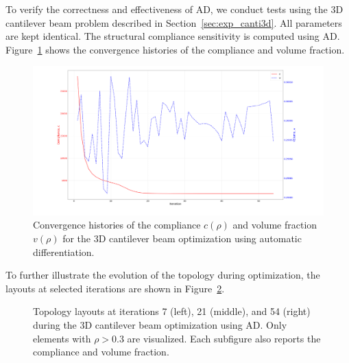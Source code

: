\documentclass[mathpazo]{cicp}
\begin{document}
To verify the correctness and effectiveness of AD, we conduct tests using the 3D cantilever beam problem described in Section~\ref{sec:exp_canti3d}. All parameters are kept identical. The structural compliance sensitivity is computed using AD. Figure~\ref{fig:canti3d_ad_convergence} shows the convergence histories of the compliance and volume fraction.
\begin{figure}[htb] 
	\centering 
	\includegraphics[width=1.0\textwidth]{figures/cantilever_3d_convergence_auto.png} \caption{Convergence histories of the compliance $c(\rho)$ and volume fraction $v(\rho)$ for the 3D cantilever beam optimization using automatic differentiation.} \label{fig:canti3d_ad_convergence} 
\end{figure}

To further illustrate the evolution of the topology during optimization, the layouts at selected iterations are shown in Figure~\ref{fig:canti3d_ad_topos}.
\begin{figure}[htb]
	\centering
	\caption{Topology layouts at iterations 7 (left), 21 (middle), and 54 (right) during the 3D cantilever beam optimization using AD. Only elements with $\rho>0.3$ are visualized. Each subfigure also reports the compliance and volume fraction.}
	\label{fig:canti3d_ad_topos}
\end{figure}
\end{document}
